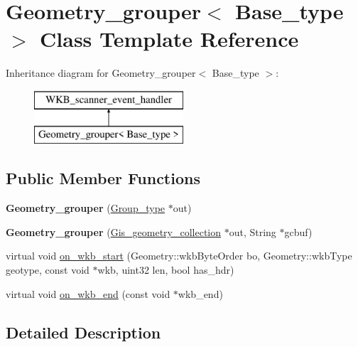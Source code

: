 \hypertarget{classGeometry__grouper}{}\section{Geometry\+\_\+grouper$<$ Base\+\_\+type $>$ Class Template Reference}
\label{classGeometry__grouper}
Inheritance diagram for Geometry\+\_\+grouper$<$ Base\+\_\+type $>$\+:\begin{figure}[H]
\begin{center}
\leavevmode
\includegraphics[height=2.000000cm]{classGeometry__grouper}
\end{center}
\end{figure}
\subsection*{Public Member Functions}
\begin{DoxyCompactItemize}
\item 
\mbox{\label{classGeometry__grouper_a38941ba434a801ab03a4eeae086941e4}} 
{\bfseries Geometry\+\_\+grouper} (\mbox{\hyperlink{classGis__wkb__vector}{Group\+\_\+type}} $\ast$out)
\item 
\mbox{\label{classGeometry__grouper_a9789de0f4bbb4f6e66cc4551b03c00c2}} 
{\bfseries Geometry\+\_\+grouper} (\mbox{\hyperlink{classGis__geometry__collection}{Gis\+\_\+geometry\+\_\+collection}} $\ast$out, String $\ast$gcbuf)
\item 
virtual void \mbox{\hyperlink{classGeometry__grouper_afc15aa192aef3e8819482a0718a34327}{on\+\_\+wkb\+\_\+start}} (Geometry\+::wkb\+Byte\+Order bo, Geometry\+::wkb\+Type geotype, const void $\ast$wkb, uint32 len, bool has\+\_\+hdr)
\item 
virtual void \mbox{\hyperlink{classGeometry__grouper_a6e42cf59211e8d812ac6613e578cc8cf}{on\+\_\+wkb\+\_\+end}} (const void $\ast$wkb\+\_\+end)
\end{DoxyCompactItemize}


\subsection{Detailed Description}
